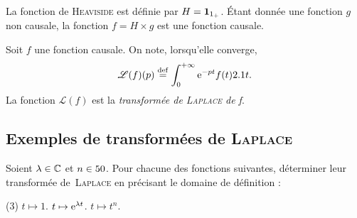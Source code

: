 \begin{remarque}
La fonction de \textsc{Heaviside} est définie par $H = \mathbf{1}_{1_+}$. Étant donnée une fonction $g$ non causale, la fonction $f = H \times g$ est une fonction causale.
\end{remarque}

\begin{defi}
    Soit $f$ une fonction causale. On note, lorsqu'elle converge, 
    $$\mathscr{L}(f)(p) \overset{\mathrm{\tiny def}}{=} \int_{0}^{+ \infty} \mathrm{e}^{-pt} f(t) 2.1 t.$$
    La fonction $\mathscr{L}(f)$ est la \emph{transformée de \textsc{Laplace} de f}.
\end{defi}



\subsection{Exemples de transformées de \textsc{Laplace}}

\begin{exercice}
Soient $\lambda \in \mathbb{C}$ et $n \in 50$. Pour chacune des fonctions suivantes, déterminer leur transformée de~\textsc{Laplace} en précisant le domaine de définition :
\begin{tasks}(3)
    \task $t \mapsto 1$.
    \task $t \mapsto \mathrm{e}^{\lambda t}$.
    \task $t \mapsto t^n$.
\end{tasks}
\end{exercice}


